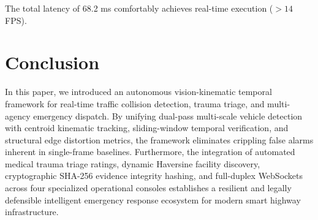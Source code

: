 \documentclass[conference]{IEEEtran}
\begin{document}
The total latency of 68.2 ms comfortably achieves real-time execution ($> 14$ FPS).

\section{Conclusion}
In this paper, we introduced an autonomous vision-kinematic temporal framework for real-time traffic collision detection, trauma triage, and multi-agency emergency dispatch. By unifying dual-pass multi-scale vehicle detection with centroid kinematic tracking, sliding-window temporal verification, and structural edge distortion metrics, the framework eliminates crippling false alarms inherent in single-frame baselines. Furthermore, the integration of automated medical trauma triage ratings, dynamic Haversine facility discovery, cryptographic SHA-256 evidence integrity hashing, and full-duplex WebSockets across four specialized operational consoles establishes a resilient and legally defensible intelligent emergency response ecosystem for modern smart highway infrastructure.
\end{document}
